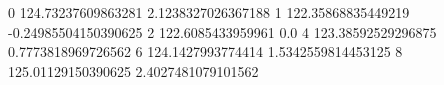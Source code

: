 0 124.73237609863281 2.1238327026367188
1 122.35868835449219 -0.24985504150390625
2 122.6085433959961 0.0
4 123.38592529296875 0.7773818969726562
6 124.1427993774414 1.5342559814453125
8 125.01129150390625 2.4027481079101562
